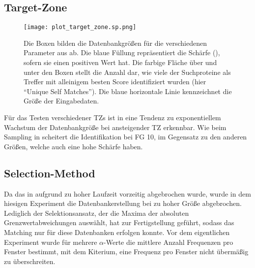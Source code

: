     \subsection{Target-Zone} %
        \label{sub:target_results}
        \begin{figure}[H]
            \centering
            \texttt{[image: plot\_target\_zone.sp.png]}
            \caption[Single-Protein-Matching ]{Die Boxen bilden die Datenbankgrößen für die verschiedenen Parameter aus  ab. Die blaue Füllung repräsentiert die Schärfe (), sofern sie einen positiven Wert hat. Die farbige Fläche über und unter den Boxen stellt die Anzahl dar, wie viele der Suchproteine als Treffer mit alleinigem besten Score identifiziert wurden (hier ``Unique Self Matches''). Die blaue horizontale Linie kennzeichnet die Größe der Eingabedaten.}
            \label{fig:target_zone.sp}
        \end{figure}

        Für das Testen verschiedener \aclp{TZ} ist in  eine Tendenz zu exponentiellem Wachstum der Datenbankgröße bei ansteigender \ac{TZ} erkennbar. Wie beim Sampling in  scheitert die Identifikation bei \ac{FG} 10, im Gegensatz zu den anderen Größen, welche auch eine hohe Schärfe haben.

    \subsection{Selection-Method} %
        \label{sub:selection_results}
        Da das  in  aufgrund zu hoher Laufzeit vorzeitig abgebrochen wurde, wurde in dem hiesigen Experiment die Datenbankerstellung bei zu hoher Größe abgebrochen. Lediglich der Selektionsansatz, der die Maxima der absoluten Grenzwertabweichungen auswählt, hat zur Fertigstellung geführt, sodass das Matching nur für diese Datenbanken erfolgen konnte. Vor dem eigentlichen Experiment wurde für mehrere $\alpha$-Werte die mittlere Anzahl Frequenzen pro Fenster bestimmt, mit dem Kiterium, eine Frequenz pro Fenster nicht übermäßig zu überschreiten.

